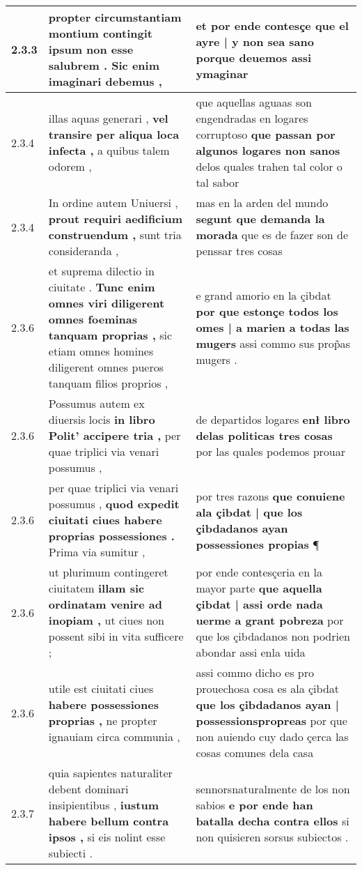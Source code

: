 \begin{tabular}{|p{1cm}|p{6.5cm}|p{6.5cm}|}
2.3.3 & propter circumstantiam montium contingit \textbf{ ipsum non esse salubrem . } Sic enim imaginari debemus , & et por ende contesçe \textbf{ que el ayre | y non sea sano } porque deuemos assi ymaginar \\\hline
2.3.4 & illas aquas generari , \textbf{ vel transire per aliqua loca infecta , } a quibus talem odorem , & que aquellas aguaas son engendradas en logares corruptoso \textbf{ que passan por algunos logares non sanos } delos quales trahen tal color o tal sabor \\\hline
2.3.4 & In ordine autem Uniuersi , \textbf{ prout requiri aedificium construendum , } sunt tria consideranda , & mas en la arden del mundo \textbf{ segunt que demanda la morada } que es de fazer son de penssar tres cosas \\\hline
2.3.6 & et suprema dilectio in ciuitate . \textbf{ Tunc enim omnes viri diligerent omnes foeminas tanquam proprias , } sic etiam omnes homines diligerent omnes pueros tanquam filios proprios , & e grand amorio en la çibdat \textbf{ por que estonçe todos los omes | a marien a todas las mugers } assi commo sus prop̃as mugers . \\\hline
2.3.6 & Possumus autem ex diuersis locis \textbf{ in libro Polit’ accipere tria , } per quae triplici via venari possumus , & de departidos logares \textbf{ enł libro delas politicas tres cosas } por las quales podemos prouar \\\hline
2.3.6 & per quae triplici via venari possumus , \textbf{ quod expedit ciuitati ciues habere proprias possessiones . } Prima via sumitur , & por tres razons \textbf{ que conuiene ala çibdat | que los çibdadanos ayan possessiones propias } ¶ \\\hline
2.3.6 & ut plurimum contingeret ciuitatem \textbf{ illam sic ordinatam venire ad inopiam , } ut ciues non possent sibi in vita sufficere ; & por ende contesçeria en la mayor parte \textbf{ que aquella çibdat | assi orde nada uerme a grant pobreza } por que los çibdadanos non podrien abondar assi enla uida \\\hline
2.3.6 & utile est ciuitati ciues \textbf{ habere possessiones proprias , } ne propter ignauiam circa communia , & assi commo dicho es pro prouechosa cosa es ala çibdat \textbf{ que los çibdadanos ayan | possessionspropreas } por que non auiendo cuy dado çerca las cosas comunes dela casa \\\hline
2.3.7 & quia sapientes naturaliter debent dominari insipientibus , \textbf{ iustum habere bellum contra ipsos , } si eis nolint esse subiecti . & sennorsnaturalmente de los non sabios \textbf{ e por ende han batalla decha contra ellos } si non quisieren sorsus subiectos . \\\hline

\end{tabular}
